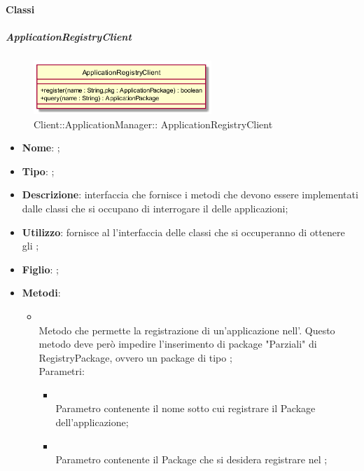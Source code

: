 \paragraph{Classi}
\hypertarget{ ApplicationRegistryClient_label}{\subparagraph{ ApplicationRegistryClient}}
\begin{figure}[h]
	\centering
	\includegraphics[width=0.60\textwidth,height=\textheight,keepaspectratio]{images/ClassApplicationRegistryClient.png}
	\caption{Client::ApplicationManager:: ApplicationRegistryClient}
\end{figure}
\begin{itemize}
	\item \textbf{Nome}: ;
	\item \textbf{Tipo}: ;
	\item \textbf{Descrizione}: interfaccia che fornisce i metodi che devono essere implementati dalle classi che si occupano di interrogare il  delle applicazioni;
	\item \textbf{Utilizzo}: fornisce al  l'interfaccia delle classi che si occuperanno di ottenere gli ;
	\item \textbf{Figlio}: ;
	\item \textbf{Metodi}:
	\begin{itemize}
		\item[]  \\		Metodo che permette la registrazione di un'applicazione nell'. Questo metodo deve però impedire l'inserimento di package "Parziali" di RegistryPackage, ovvero un package di tipo ;\\
		Parametri:
		\begin{itemize}
			\item {} \\
			Parametro contenente il nome sotto cui registrare il Package dell'applicazione;
			\item {} \\
			Parametro contenente il Package che si desidera registrare nel ;

\end{itemize}
\end{itemize}
\end{itemize}

